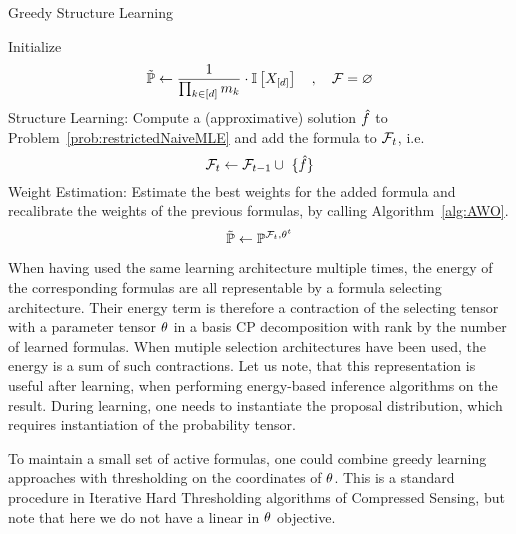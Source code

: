 \begin{algorithm}[hbt!]
\caption{Greedy Structure Learning}\label{alg:greedyStructureLearning}
\begin{algorithmic}
	\State Initialize
		\[ \tilde{\mathbb{P}} \leftarrow \frac{1}{\prod_{k\in[d]}m_{k}} \cdot \mathbb{I}\left[X_{[d]}\right] \quad, \quad \mathcal{F} = \varnothing \]
		\State Structure Learning: Compute a (approximative) solution $\hat{f}$ to Problem~\ref{prob:restrictedNaiveMLE} and add the formula to $\mathcal{F}_{t}$, i.e.
				\[ \formulasetof{t} \algdefsymbol \formulasetof{t-1} \cup \{\hat{\formula}\} \]
		\State Weight Estimation: Estimate the best weights for the added formula and recalibrate the weights of the previous formulas, by calling Algorithm~\ref{alg:AWO}.
			\[ \tilde{\mathbb{P}} \leftarrow \mathbb{P}^{\mathcal{F}_{t}, \theta^{t}} \]
\EndWhile
\end{algorithmic}
\end{algorithm}



When having used the same learning architecture multiple times, the energy of the corresponding formulas are all representable by a formula selecting architecture.
Their energy term is therefore a contraction of the selecting tensor with a parameter tensor $\theta$ in a basis CP decomposition with rank by the number of learned formulas.
When mutiple selection architectures have been used, the energy is a sum of such contractions.
% 
Let us note, that this representation is useful after learning, when performing energy-based inference algorithms on the result.
During learning, one needs to instantiate the proposal distribution, which requires instantiation of the probability tensor.


\begin{remark}
	To maintain a small set of active formulas, one could combine greedy learning approaches with thresholding on the coordinates of $\theta$.
	This is a standard procedure in Iterative Hard Thresholding algorithms of Compressed Sensing, but note that here we do not have a linear in $\theta$ objective.
\end{remark}




